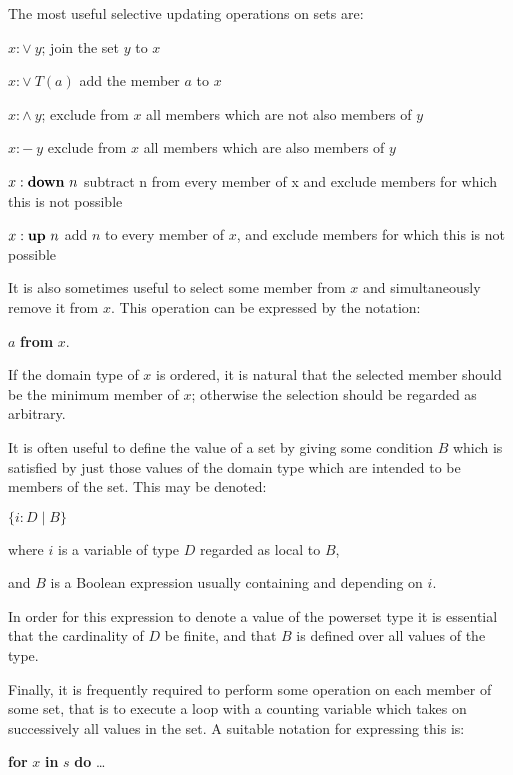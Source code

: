 The most useful selective updating operations on sets are:

\noindent
$x:\vee\ y$; \tabto*{5em} join the set $y$ to $x$

\noindent
$x:\vee\ T(a)$ \tabto*{5em} add the member $a$ to $x$

\noindent
$x:\wedge\ y$; \tabto*{5em} exclude from $x$ all members which are not also members of $y$

\noindent
$x:-\ y$ \tabto*{5em} exclude from $x$ all members which are also members of $y$

\noindent
{}\parindent$x:\text{\textbf{down} }n$ \tabto*{5em} subtract n from every member of x and exclude members for which this is not possible

\noindent
{}\parindent$x:\text{\textbf{up} } n$ \tabto*{5em} add $n$ to every member of $x$, and exclude members for which this is not possible

\noindent
It is also sometimes useful to select some member from $x$ and simultaneously remove it from $x$. This operation can be expressed by the notation:

\quad $a$ \textbf{from} $x$.

\noindent
If the domain type of $x$ is ordered, it is natural that the selected member should be the minimum member of $x$; otherwise the selection should be regarded as arbitrary.

It is often useful to define the value of a set by giving some condition $B$ which is satisfied by just those values of the domain type which are intended to be members of the set. This may be denoted:

\quad $\{i:D \mid B\}$

\noindent
where \tabto*{4em} $i$ is a variable of type $D$ regarded as local to $B$,

\noindent
and \tabto*{4em} $B$ is a Boolean expression usually containing and depending on $i$.

\noindent
In order for this expression to denote a value of the powerset type it is essential that the cardinality of $D$ be finite, and that $B$ is defined over all values of the type.

Finally, it is frequently required to perform some operation on each member of some set, that is to execute a loop with a counting variable which takes on successively all values in the set. A suitable notation for expressing this is:

\quad \textbf{for} $x$ \textbf{in} $s$ \textbf{do} \dots

